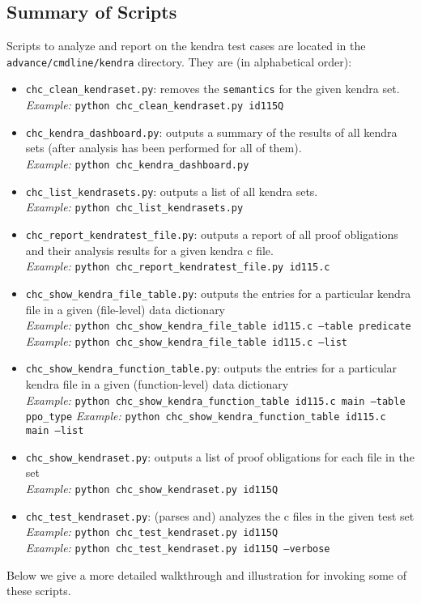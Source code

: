 \documentclass[11pt]{article}
\begin{document}
\subsection{Summary of Scripts}
Scripts to analyze and report on the kendra test cases are located in the 
{\tt advance/cmdline/kendra} directory. They are (in alphabetical
order):
\begin{itemize}[leftmargin=*]
\item {\tt chc\_clean\_kendraset.py}: removes the {\tt semantics} for the given
  kendra set. \\
  \emph{Example:} {\tt python chc\_clean\_kendraset.py id115Q}
\item {\tt chc\_kendra\_dashboard.py}: outputs a summary of the results of all
  kendra sets (after analysis has been performed for all of them). \\
  \emph{Example:} {\tt python chc\_kendra\_dashboard.py}
\item {\tt chc\_list\_kendrasets.py}: outputs a list of all kendra sets.\\
  \emph{Example:} {\tt python chc\_list\_kendrasets.py}
\item {\tt chc\_report\_kendratest\_file.py}: outputs a report of all proof obligations
   and their analysis results for a given kendra c file. \\
   \emph{Example:} {\tt python chc\_report\_kendratest\_file.py id115.c}
\item {\tt chc\_show\_kendra\_file\_table.py}: outputs the entries for a particular
   kendra file in a given (file-level) data dictionary \\
   \emph{Example:} {\tt python chc\_show\_kendra\_file\_table id115.c --table predicate} \\
   \emph{Example:} {\tt python chc\_show\_kendra\_file\_table id115.c --list}
\item {\tt chc\_show\_kendra\_function\_table.py}: outputs the entries for a particular
   kendra file in a given (function-level) data dictionary \\
   \emph{Example:} {\tt python chc\_show\_kendra\_function\_table id115.c main --table 
     ppo\_type}
   \emph{Example:} {\tt python chc\_show\_kendra\_function\_table id115.c main --list}
\item {\tt chc\_show\_kendraset.py}: outputs a list of proof obligations for each file
    in the set \\
    \emph{Example:} {\tt python chc\_show\_kendraset.py id115Q}
\item {\tt chc\_test\_kendraset.py}: (parses and) analyzes the c files in the given test
    set \\
    \emph{Example:} {\tt python chc\_test\_kendraset.py id115Q} \\
    \emph{Example:} {\tt python chc\_test\_kendraset.py id115Q --verbose}
\end{itemize}
Below we give a more detailed walkthrough and illustration for invoking some of these scripts.
\end{document}
